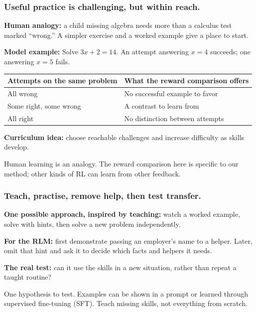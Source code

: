 \documentclass[aspectratio=169,11pt]{beamer}
\newcommand{\aside}[1]{\vfill{\footnotesize\color{Gray}#1\par}}
\begin{document}
\begin{frame}[t]
\frametitle{Useful practice is challenging, but within reach.}
\textbf{Human analogy:} a child missing algebra needs more than a calculus test marked ``wrong.'' A simpler exercise and a worked example give a place to start.

\medskip
\textbf{Model example:} Solve $3x+2=14$. An attempt answering $x=4$ succeeds; one answering $x=5$ fails.
\smallskip
\begin{center}
\renewcommand{\arraystretch}{1.15}
\begin{tabular}{ll}
\toprule
Attempts on the same problem & What the reward comparison offers \\
\midrule
All wrong & No successful example to favor \\
Some right, some wrong & A contrast to learn from \\
All right & No distinction between attempts \\
\bottomrule
\end{tabular}
\end{center}
\textbf{Curriculum idea:} choose reachable challenges and increase difficulty as skills develop.
\aside{Human learning is an analogy. The reward comparison here is specific to our method; other kinds of RL can learn from other feedback.}
\end{frame}

\begin{frame}[t]
\frametitle{Teach, practise, remove help, then test transfer.}
\textbf{One possible approach, inspired by teaching:} watch a worked example, solve with hints, then solve a new problem independently.
\medskip
\begin{center}
\end{center}
\medskip
\textbf{For the RLM:} first demonstrate passing an employer's name to a helper. Later, omit that hint and ask it to decide which facts and helpers it needs.
\medskip

\textbf{The real test:} can it use the skills in a new situation, rather than repeat a taught routine?
\aside{One hypothesis to test. Examples can be shown in a prompt or learned through supervised fine-tuning (SFT). Teach missing skills, not everything from scratch.}
\end{frame}
\end{document}
